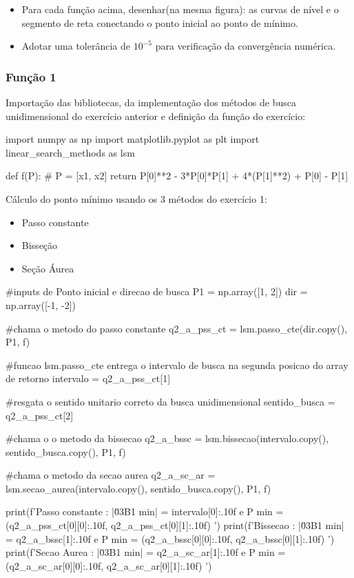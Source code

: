 \documentclass[10pt, a4paper]{article}
\begin{document}
\begin{itemize}
  \item Para cada função acima, desenhar(na mesma figura): as curvas de nível e o segmento de reta
  conectando o ponto inicial ao ponto de mínimo.
  \item Adotar uma tolerância de $10^{-5}$ para verificação da convergência numérica.
\end{itemize}

\subsubsection{Função 1}

Importação das bibliotecas, da implementação dos métodos de busca unidimensional do exercício anterior e
definição da função do exercício:

\begin{python}
  import numpy as np
  import matplotlib.pyplot as plt
  import linear_search_methods as lsm

  def f(P):
    # P = [x1, x2]
    return P[0]**2 - 3*P[0]*P[1] + 4*(P[1]**2) + P[0] - P[1]
\end{python}

  Cálculo do ponto mínimo usando os 3 métodos do exercício 1:

\begin{itemize}
  \item Passo constante
  \item Bisseção
  \item Seção Áurea
\end{itemize}

\begin{python}

  #inputs de Ponto inicial e direcao de busca
  P1 = np.array([1, 2])
  dir = np.array([-1, -2])

  #chama o metodo do passo constante
  q2_a_pss_ct = lsm.passo_cte(dir.copy(), P1, f)

  #funcao lsm.passo_cte entrega o intervalo de busca na segunda posicao do array de retorno
  intervalo = q2_a_pss_ct[1]

  #resgata o sentido unitario correto da busca unidimensional
  sentido_busca = q2_a_pss_ct[2]

  #chama o o metodo da bissecao
  q2_a_bssc = lsm.bissecao(intervalo.copy(), sentido_busca.copy(), P1, f)

  #chama o metodo da secao aurea
  q2_a_sc_ar = lsm.secao_aurea(intervalo.copy(), sentido_busca.copy(), P1, f)

  print(f'Passo constante : |\u03B1 min| = {intervalo[0]:.10f} e P min = ({q2_a_pss_ct[0][0]:.10f}, {q2_a_pss_ct[0][1]:.10f}) ')
  print(f'Bissecao        : |\u03B1 min| = {q2_a_bssc[1]:.10f} e P min = ({q2_a_bssc[0][0]:.10f}, {q2_a_bssc[0][1]:.10f}) ')
  print(f'Secao Aurea     : |\u03B1 min| = {q2_a_sc_ar[1]:.10f} e P min = ({q2_a_sc_ar[0][0]:.10f}, {q2_a_sc_ar[0][1]:.10f}) ')

\end{python}
\end{document}
